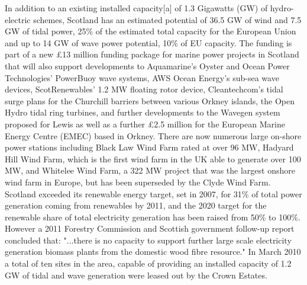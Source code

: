 \begin{tcolorbox}\footnotesize
	In addition to an existing installed capacity[a] of 1.3 Gigawatts (GW) of hydro-electric schemes, Scotland has an estimated potential of 36.5 GW of wind and 7.5 GW of tidal power, 25\% of the estimated total capacity for the European Union and up to 14 GW of wave power potential, 10\% of EU capacity.
	The funding is part of a new £13 million funding package for marine power projects in Scotland that will also support developments to Aquamarine's Oyster and Ocean Power Technologies' PowerBuoy wave systems, AWS Ocean Energy's sub-sea wave devices, ScotRenewables' 1.2 MW floating rotor device, Cleantechcom's tidal surge plans for the Churchill barriers between various Orkney islands, the Open Hydro tidal ring turbines, and further developments to the Wavegen system proposed for Lewis as well as a further £2.5 million for the European Marine Energy Centre (EMEC) based in Orkney.
	There are now numerous large on-shore power stations including Black Law Wind Farm rated at over 96 MW, Hadyard Hill Wind Farm, which is the first wind farm in the UK able to generate over 100 MW, and Whitelee Wind Farm, a 322 MW project that was the largest onshore wind farm in Europe, but has been superseded by the Clyde Wind Farm.
	Scotland exceeded its renewable energy target, set in 2007, for 31\% of total power generation coming from renewables by 2011, and the 2020 target for the renewable share of total electricity generation has been raised from 50\% to 100\%.
	However a 2011 Forestry Commission and Scottish government follow-up report concluded that: "...there is no capacity to support further large scale electricity generation biomass plants from the domestic wood fibre resource."
	In March 2010 a total of ten sites in the area, capable of providing an installed capacity of 1.2 GW of tidal and wave generation were leased out by the Crown Estates.
\end{tcolorbox}	




